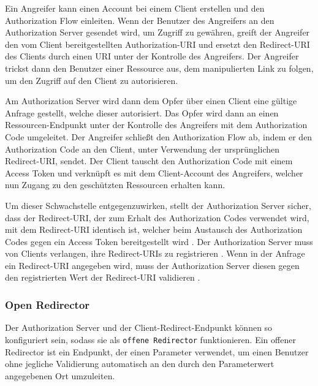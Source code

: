 Ein Angreifer kann einen Account bei einem Client erstellen und den Authorization Flow einleiten. Wenn der Benutzer des Angreifers an den Authorization Server gesendet wird, um Zugriff zu gewähren, greift der Angreifer den vom Client bereitgestellten Authorization-URI und ersetzt den Redirect-URI des Clients durch einen URI unter der Kontrolle des Angreifers. Der Angreifer trickst dann den Benutzer einer Ressource aus, dem manipulierten Link zu folgen, um den Zugriff auf den Client zu autorisieren. \cite{SSEB_OAuthAuthorizationSecurityConsiderations}

Am Authorization Server wird dann dem Opfer über einen Client eine gültige Anfrage gestellt, welche dieser autorisiert. Das Opfer wird dann an einen Ressourcen-Endpunkt unter der Kontrolle des Angreifers mit dem Authorization Code umgeleitet. Der Angreifer schließt den Authorization Flow ab, indem er den Authorization Code an den Client, unter Verwendung der ursprünglichen Redirect-URI, sendet. Der Client tauscht den Authorization Code mit einem Access Token und verknüpft es mit dem Client-Account des Angreifers, welcher nun Zugang zu den geschützten Ressourcen erhalten kann. \cite{SSEB_OAuthAuthorizationSecurityConsiderations}

Um dieser Schwachstelle entgegenzuwirken, stellt der Authorization Server sicher, dass der Redirect-URI, der zum Erhalt des Authorization Codes verwendet wird, mit dem Redirect-URI identisch ist, welcher beim Austausch des Authorization Codes gegen ein Access Token bereitgestellt wird \cite{SSEB_OAuthAuthorizationSecurityConsiderations}\cite[Sec. 19]{SSEB_keycloakDocs}. Der Authorization Server muss von Clients verlangen, ihre Redirect-URIs zu registrieren \cite{SSEB_OAuthAuthorizationSecurityConsiderations}. Wenn in der Anfrage ein Redirect-URI angegeben wird, muss der Authorization Server diesen gegen den registrierten Wert der Redirect-URI validieren \cite[Sec. 19]{SSEB_keycloakDocs}.

\subsubsection{Open Redirector}

Der Authorization Server und der Client-Redirect-Endpunkt können so konfiguriert sein, sodass sie als \texttt{offene Redirector} funktionieren. Ein offener Redirector ist ein Endpunkt, der einen Parameter verwendet, um einen Benutzer ohne jegliche Validierung automatisch an den durch den Parameterwert angegebenen Ort umzuleiten. \cite{SSEB_OAuthAuthorizationSecurityConsiderations}

